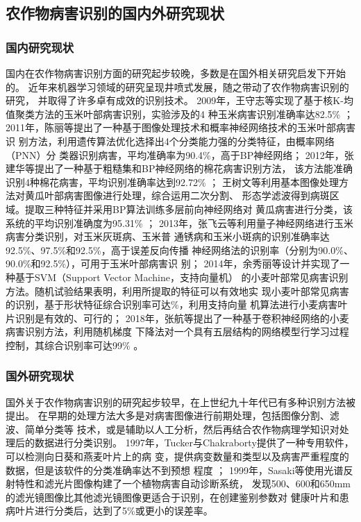 \subsection{\hei\xiaosan\textbf{农作物病害识别的国内外研究现状}}
  \subsubsection{\hei\sihao\textbf{国内研究现状}}
    国内在农作物病害识别方面的研究起步较晚，多数是在国外相关研究启发下开始的。
    近年来机器学习领域的研究呈现井喷式发展，随之带动了农作物病害识别的研究，
    并取得了许多卓有成效的识别技术。
    2009年，王守志等实现了基于核K-均值聚类方法的玉米叶部病害识别，实验涉及的4
    种玉米病害识别准确率达82.5\% \cite{王守志2009基于核}；
    2011年，陈丽等提出了一种基于图像处理技术和概率神经网络技术的玉米叶部病害识
    别方法，利用遗传算法优化选择出4个分类能力强的分类特征，由概率网络（PNN）分
    类器识别病害，平均准确率为90.4\%，高于BP\zs 神经网络\cite{陈丽2011概率神经网络在玉米叶部病害识别中的应用}；
    2012年，张建华等提出了一种基于粗糙集和BP神经网络的棉花病害识别方法，
    该方法能准确识别4种棉花病害，平均识别准确率达到92.72\% \cite{张建华2012基于粗糙集和}；
    王树文\zs 等利用基本图像处理\zs 方法对黄瓜叶部病害\zs 图像进行处理，\zs 综合运用\zs 二次分割、
    形态学滤波得到病斑区域。提取三种特征并采用BP算法训练多层前向神经网络对
    黄瓜病害进行分类，该系统的平均识别准确度为95.31\% \cite{王树文2012基于图像处理技术的黄瓜叶片病害识别诊断系统研究}；
    2013年，张飞云等利用\zs 量子神经网络进行\zs 玉米病害分类识别，对玉米灰斑病、玉米普
    通锈病和玉米小斑病的识别准确率达92.5\%、97.5\%和92.5\%，高于误差反向传播
    神经网络法的识别率（分别为90.0\%、90.0\%和92.5\%），可用于玉米叶部病害识
    别\cite{张飞云2013基于量子神经网络和组合特征参数的玉米叶部病害识别}；
    2014年，余秀丽等设计并实现了一种基于\zs SVM（Support Vector Machine，\zs 支持向量机）
    的小麦\zs 叶部常见病害识别\zs 方法。随机试验结果\zs 表明，利用所提取\zs 的特征可以有效地实\zs 
    现小麦叶部常见病害的\zs 识别，基于形状\zs 特征综合识别率可达\%，利用支持向量
    机算法\zs 进行小麦病害叶片识别是\zs 有效的、可行的\cite{余秀丽2014基于}；
    2018年，张航等提出了\zs 一种基于卷积神经\zs 网络的小麦病害识别方法，\zs 利用随机梯度
    下降法\zs 对一个具有五层结构\zs 的网络模型行学习过程控制，\zs 其综合识别率可达99\% 
    \cite{张航2018一种基于卷积神经网络的小麦病害识别方法}。

  \subsubsection{\hei\sihao\textbf{国外研究现状}}
    国外关于农作物病害识别的研究起步较早，在上世纪九十年代已有多种识别方法被提出。
    在早期的处理方法大多是对病害图像进行前期处理，包括图像分割、滤波、简单分类等
    技术，或是辅助以人工分析，然后再结合农作物病理学知识对处理后的数据进行分类识别。
    1997年，Tucker与Chakraborty提供了一种专用软件，可以检测向日葵和燕麦叶片上的病
    变，提供病变数量和类型以及病害严重程度的数据，但是该软件的分类准确率达不到预想
    程度 \cite{tucker1997quantitative}；
    1999年，Sasaki等使用光谱反射特性和滤光片图像构建了一个植物病害自动诊断系统，
    发现500、600和650mm的滤光镜图像比其他滤光镜图像更适合于识别，在创建鉴别参数对
    健康叶片和患病叶片进行分类后，达到了5\%或更小的误差率\cite{sasaki1999automatic}。

